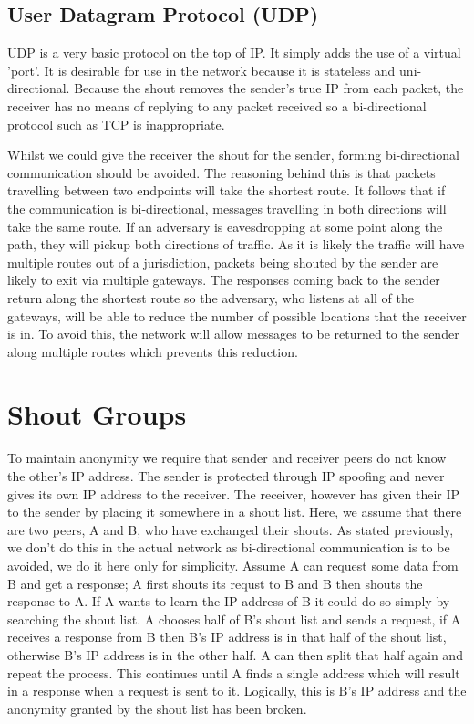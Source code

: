 \documentclass[ %
                    author={Luke Murray},
                supervisor={Dr. Simon Hollis},
                     title={Shadow Peer-to-Peer Networks},
                  subtitle={},
                    degree={MEng},
                      year={2013} ]{thesis}
\begin{document}
\subsection{User Datagram Protocol (UDP)}

UDP is a very basic protocol on the top of IP. It simply adds the use of a virtual 'port'. It is desirable for use in the network because it is stateless and uni-directional. Because the shout removes the sender's true IP from each packet, the receiver has no means of replying to any packet received so a bi-directional protocol such as TCP is inappropriate.

Whilst we could give the receiver the shout for the sender, forming bi-directional communication should be avoided. The reasoning behind this is that packets travelling between two endpoints will take the shortest route. It follows that if the communication is bi-directional, messages travelling in both directions will take the same route. If an adversary is eavesdropping at some point along the path, they will pickup both directions of traffic. As it is likely the traffic will have multiple routes out of a jurisdiction, packets being shouted by the sender are likely to exit via multiple gateways. The responses coming back to the sender return along the shortest route so the adversary, who listens at all of the gateways, will be able to reduce the number of possible locations that the receiver is in. To avoid this, the network will allow messages to be returned to the sender along multiple routes which prevents this reduction.

\section{Shout Groups}
\label{sec:shout_groups}

To maintain anonymity we require that sender and receiver peers do not know the other's IP address. The sender is protected through IP spoofing and never gives its own IP address to the receiver. The receiver, however has given their IP to the sender by placing it somewhere in a shout list. Here, we assume that there are two peers, A and B, who have exchanged their shouts. As stated previously, we don't do this in the actual network as bi-directional communication is to be avoided, we do it here only for simplicity. Assume A can request some data from B and get a response; A first shouts its requst to B and B then shouts the response to A. If A wants to learn the IP address of B it could do so simply by searching the shout list. A chooses half of B's shout list and sends a request, if A receives a response from B then B's IP address is in that half of the shout list, otherwise B's IP address is in the other half. A can then split that half again and repeat the process. This continues until A finds a single address which will result in a response when a request is sent to it. Logically, this is B's IP address and the anonymity granted by the shout list has been broken.
\end{document}

